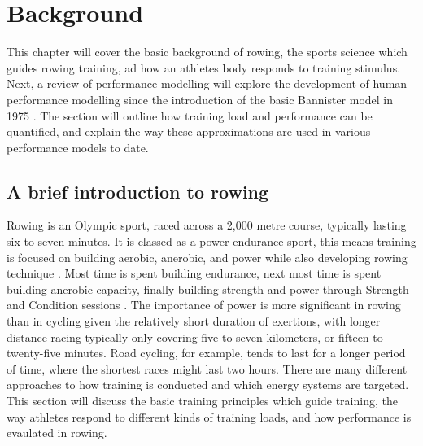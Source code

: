\chapter{Background}
\label{Chapt2}
This chapter will cover the basic background of rowing, the sports science which guides rowing training, ad how an athletes body responds to training stimulus. Next, a review of performance modelling will explore the development of human performance modelling since the introduction of the basic Bannister model in 1975 \autocite{Bannister1976}. The section will outline how training load and performance can be quantified, and explain the way these approximations are used in various performance models to date.

\section{A brief introduction to rowing}
Rowing is an Olympic sport, raced across a 2,000 metre course, typically lasting six to seven minutes. It is classed as a power-endurance sport, this means training is focused on building aerobic, anerobic, and power while also developing rowing technique \autocite{Mäestu2005}. Most time is spent building endurance, next most time is spent building anerobic capacity, finally building strength and power through Strength and Condition sessions \autocite{Seiler2006}. The importance of power is more significant in rowing than in cycling given the relatively short duration of exertions, with longer distance racing typically only covering five to seven kilometers, or fifteen to twenty-five minutes. Road cycling, for example, tends to last for a longer period of time, where the shortest races might last two hours. There are many different approaches to how training is conducted and which energy systems are targeted. This section will discuss the basic training principles which guide training, the way athletes respond to different kinds of training loads, and how performance is evaulated in rowing. 

